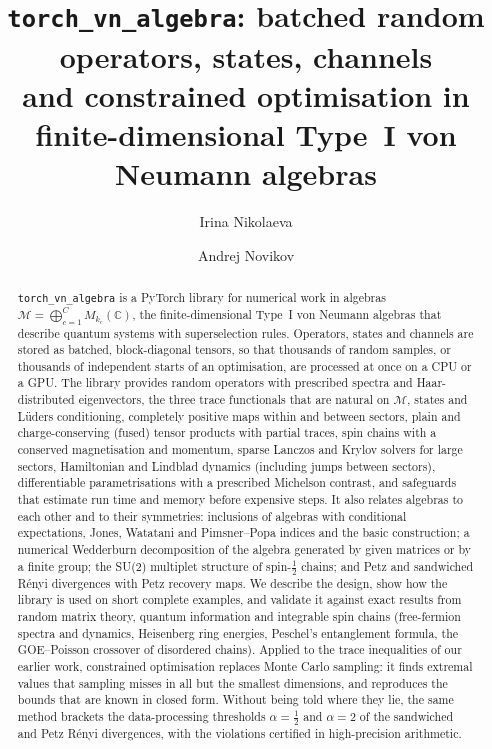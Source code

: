 \documentclass[11pt]{article}
\title{\texttt{torch\_vn\_algebra}: batched random operators, states, channels\\
and constrained optimisation in finite-dimensional Type~I von Neumann algebras}
\author{Irina Nikolaeva \and Andrej Novikov}
\date{}
\newcommand{\C}{\mathbb{C}}
\newcommand{\M}{\mathcal{M}}
\begin{document}
\maketitle

\begin{abstract}
\texttt{torch\_vn\_algebra} is a PyTorch library for numerical work in algebras
$\M=\bigoplus_{c=1}^C M_{k_c}(\C)$, the finite-dimensional Type~I von Neumann algebras that describe
quantum systems with superselection rules. Operators, states and channels are stored as batched,
block-diagonal tensors, so that thousands of random samples, or thousands of independent starts of
an optimisation, are processed at once on a CPU or a GPU. The library provides random operators with
prescribed spectra and Haar-distributed eigenvectors, the three trace functionals that are natural on
$\M$, states and Lüders conditioning, completely positive maps within and between sectors, plain and
charge-conserving (fused) tensor products with partial traces, spin chains with a conserved
magnetisation and momentum, sparse Lanczos and Krylov solvers for large sectors, Hamiltonian and
Lindblad dynamics (including jumps between sectors), differentiable parametrisations with a prescribed
Michelson contrast, and safeguards that estimate run time and memory before expensive steps. It also
relates algebras to each other and to their symmetries: inclusions of algebras with conditional expectations,
Jones, Watatani and Pimsner--Popa indices and the basic construction; a numerical Wedderburn decomposition of the
algebra generated by given matrices or by a finite group; the SU(2) multiplet structure of spin-$\frac12$ chains; and
Petz and sandwiched Rényi divergences with Petz recovery maps. We
describe the design, show how the library is used on short complete examples, and validate it against
exact results from random matrix theory, quantum information and integrable spin chains (free-fermion
spectra and dynamics, Heisenberg ring energies, Peschel's entanglement formula, the GOE--Poisson
crossover of disordered chains). Applied to the trace inequalities of our earlier work, constrained
optimisation replaces Monte Carlo sampling: it finds extremal values that sampling misses in all but the
smallest dimensions, and reproduces the bounds that are known in closed form. Without being told where they lie,
the same method brackets the data-processing thresholds $\alpha=\frac12$ and $\alpha=2$ of the sandwiched and Petz
Rényi divergences, with the violations certified in high-precision arithmetic.
\end{abstract}
\end{document}
